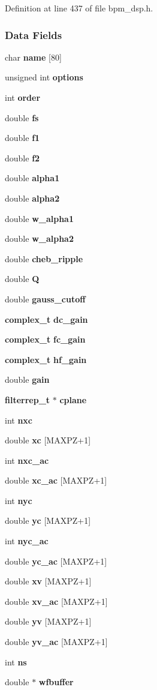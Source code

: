 Definition at line 437 of file bpm\_\-dsp.h.\subsubsection*{Data Fields}
\begin{CompactItemize}
\item 
char {\bf name} [80]
\item 
unsigned int {\bf options}
\item 
int {\bf order}
\item 
double {\bf fs}
\item 
double {\bf f1}
\item 
double {\bf f2}
\item 
double {\bf alpha1}
\item 
double {\bf alpha2}
\item 
double {\bf w\_\-alpha1}
\item 
double {\bf w\_\-alpha2}
\item 
double {\bf cheb\_\-ripple}
\item 
double {\bf Q}
\item 
double {\bf gauss\_\-cutoff}
\item 
{\bf complex\_\-t} {\bf dc\_\-gain}
\item 
{\bf complex\_\-t} {\bf fc\_\-gain}
\item 
{\bf complex\_\-t} {\bf hf\_\-gain}
\item 
double {\bf gain}
\item 
{\bf filterrep\_\-t} $\ast$ {\bf cplane}
\item 
int {\bf nxc}
\item 
double {\bf xc} [MAXPZ+1]
\item 
int {\bf nxc\_\-ac}
\item 
double {\bf xc\_\-ac} [MAXPZ+1]
\item 
int {\bf nyc}
\item 
double {\bf yc} [MAXPZ+1]
\item 
int {\bf nyc\_\-ac}
\item 
double {\bf yc\_\-ac} [MAXPZ+1]
\item 
double {\bf xv} [MAXPZ+1]
\item 
double {\bf xv\_\-ac} [MAXPZ+1]
\item 
double {\bf yv} [MAXPZ+1]
\item 
double {\bf yv\_\-ac} [MAXPZ+1]
\item 
int {\bf ns}
\item 
double $\ast$ {\bf wfbuffer}
\end{CompactItemize}


